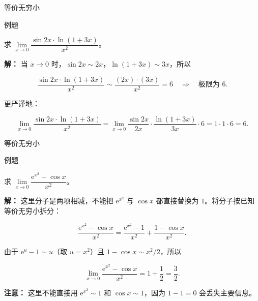 \documentclass[aspectratio=169,10pt,fontset=fandol]{ctexbeamer}
\newcommand{\ee}{\mathrm{e}}
\begin{document}
\begin{frame}[t,fragile]{等价无穷小}
\normalsize
\begin{block}{例题}
{\normalsize


求 \(\lim\limits_{x \to 0} \dfrac{\sin 2x \cdot \ln(1+3x)}{x^2}\)。


}
\end{block}
\pause
{\normalsize
\textbf{解：}
当 \(x \to 0\) 时，\(\sin 2x \sim 2x\)，\(\ln(1+3x) \sim 3x\)，所以

\[

\dfrac{\sin 2x \cdot \ln(1+3x)}{x^2} \sim \dfrac{(2x) \cdot (3x)}{x^2} = 6 \quad \Rightarrow \quad \text{极限为 } 6.

\]

更严谨地：

\[

\lim_{x \to 0} \dfrac{\sin 2x \cdot \ln(1+3x)}{x^2} = \lim_{x \to 0} \dfrac{\sin 2x}{2x} \cdot \dfrac{\ln(1+3x)}{3x} \cdot 6 = 1 \cdot 1 \cdot 6 = 6.

\]


}
\end{frame}
\begin{frame}[t,fragile]{等价无穷小}
\normalsize
\begin{block}{例题}
{\normalsize


求 \(\lim\limits_{x \to 0} \dfrac{\ee^{x^2} - \cos x}{x^2}\)。


}
\end{block}
\pause
{\normalsize
\textbf{解：}
这里分子是两项相减，不能把 \(\ee^{x^2}\) 与 \(\cos x\) 都直接替换为 \(1\)。将分子按已知等价无穷小拆分：

\[

\frac{\ee^{x^2}-\cos x}{x^2}

=\frac{\ee^{x^2}-1}{x^2}+\frac{1-\cos x}{x^2}.

\]

由于 \(\ee^u-1\sim u\)（取 \(u=x^2\)）且 \(1-\cos x\sim x^2/2\)，所以

\[

\lim_{x\to0}\frac{\ee^{x^2}-\cos x}{x^2}

=1+\frac12=\frac32.

\]



\textbf{注意：} 这里不能直接用 \(\ee^{x^2}\sim1\) 和 \(\cos x\sim1\)，因为 \(1-1=0\) 会丢失主要信息。


}
\end{frame}
\end{document}
